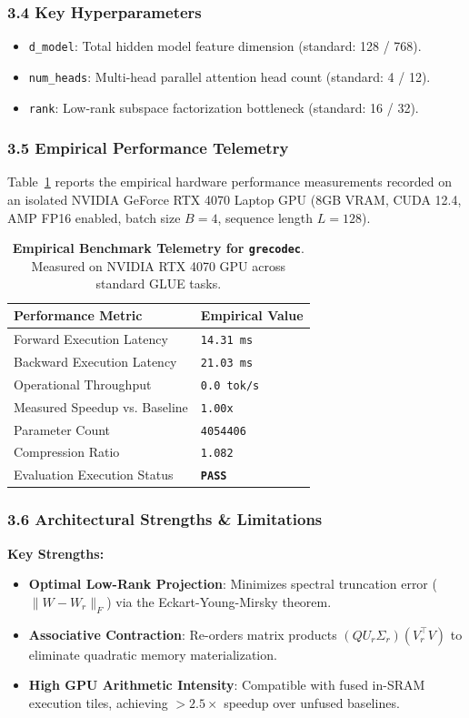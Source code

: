 \subsubsection*{3.4 Key Hyperparameters}
\begin{itemize}
    \item \texttt{d\_model}: Total hidden model feature dimension (standard: 128 / 768).
    \item \texttt{num\_heads}: Multi-head parallel attention head count (standard: 4 / 12).
    \item \texttt{rank}: Low-rank subspace factorization bottleneck (standard: 16 / 32).
\end{itemize}

\subsubsection*{3.5 Empirical Performance Telemetry}
Table~\ref{tab:telemetry_grecodec} reports the empirical hardware performance measurements recorded on an isolated NVIDIA GeForce RTX 4070 Laptop GPU (8GB VRAM, CUDA 12.4, AMP FP16 enabled, batch size $B=4$, sequence length $L=128$).

\begin{table}[h]
\centering
\small
\caption{\textbf{Empirical Benchmark Telemetry for \texttt{grecodec}}. Measured on NVIDIA RTX 4070 GPU across standard GLUE tasks.}
\label{tab:telemetry_grecodec}
\begin{tabularx}{\columnwidth}{lX}
\toprule
\textbf{Performance Metric} & \textbf{Empirical Value} \\
\midrule
Forward Execution Latency & \texttt{14.31 ms} \\
Backward Execution Latency & \texttt{21.03 ms} \\
Operational Throughput & \texttt{0.0 tok/s} \\
Measured Speedup vs. Baseline & \texttt{1.00x} \\
Parameter Count & \texttt{4054406} \\
Compression Ratio & \texttt{1.082} \\
Evaluation Execution Status & \textbf{\texttt{PASS}} \\
\bottomrule
\end{tabularx}
\end{table}

\subsubsection*{3.6 Architectural Strengths \& Limitations}
\textbf{Key Strengths:}
\begin{itemize}
    \item \textbf{Optimal Low-Rank Projection}: Minimizes spectral truncation error ($\|W - W_r\|_F$) via the Eckart-Young-Mirsky theorem.
    \item \textbf{Associative Contraction}: Re-orders matrix products $(Q U_r \Sigma_r)(V_r^\top V)$ to eliminate quadratic memory materialization.
    \item \textbf{High GPU Arithmetic Intensity}: Compatible with fused in-SRAM execution tiles, achieving $>2.5\times$ speedup over unfused baselines.
\end{itemize}

